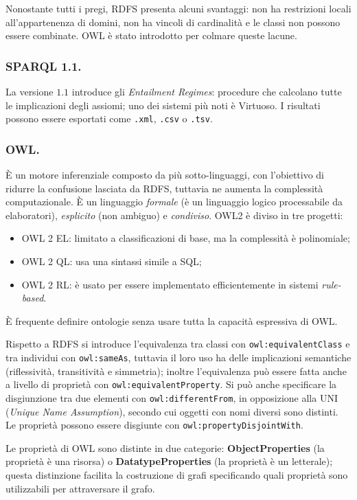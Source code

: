 \documentclass[11pt]{article}
\begin{document}
Nonostante tutti i pregi, RDFS presenta alcuni svantaggi: non ha restrizioni locali all'appartenenza di domini, non ha vincoli di cardinalità e le classi non possono essere combinate.
OWL è stato introdotto per colmare queste lacune.


\subsubsection{SPARQL 1.1.}
La versione $1.1$ introduce gli \textit{Entailment Regimes}: procedure che calcolano tutte le implicazioni degli assiomi; uno dei sistemi più noti è Virtuoso.
I risultati possono essere esportati come \verb|.xml|, \verb|.csv| o \verb|.tsv|.

\subsubsection{OWL.}
È un motore inferenziale composto da più sotto-linguaggi, con l'obiettivo di ridurre la confusione lasciata da RDFS, tuttavia ne aumenta la complessità computazionale.
È un linguaggio \textit{formale} (è un linguaggio logico processabile da elaboratori), \textit{esplicito} (non ambiguo) e \textit{condiviso}.
OWL2 è diviso in tre progetti:
\begin{itemize}
  \item OWL 2 EL: limitato a classificazioni di base, ma la complessità è polinomiale;
  \item OWL 2 QL: usa una sintassi simile a SQL;
  \item OWL 2 RL: è usato per  essere implementato efficientemente in sistemi \textit{rule-based}.
\end{itemize}
È frequente definire ontologie senza usare tutta la capacità espressiva di OWL.

Rispetto a RDFS si introduce l'equivalenza tra classi con \verb|owl:equivalentClass| e tra individui con \verb|owl:sameAs|, tuttavia il loro uso ha delle implicazioni semantiche (riflessività, transitività e simmetria); inoltre l'equivalenza può essere fatta anche a livello di proprietà con \verb|owl:equivalentProperty|.
Si può anche specificare la disgiunzione tra due elementi con \verb|owl:differentFrom|, in opposizione alla UNI (\textit{Unique Name Assumption}), secondo cui oggetti con nomi diversi sono distinti.
Le proprietà possono essere disgiunte con \verb|owl:propertyDisjointWith|.

Le proprietà di OWL sono distinte in due categorie: \textbf{ObjectProperties} (la proprietà è una risorsa) o \textbf{DatatypeProperties} (la proprietà è un letterale); questa distinzione facilita la costruzione di grafi specificando quali proprietà sono utilizzabili per attraversare il grafo.
\end{document}
